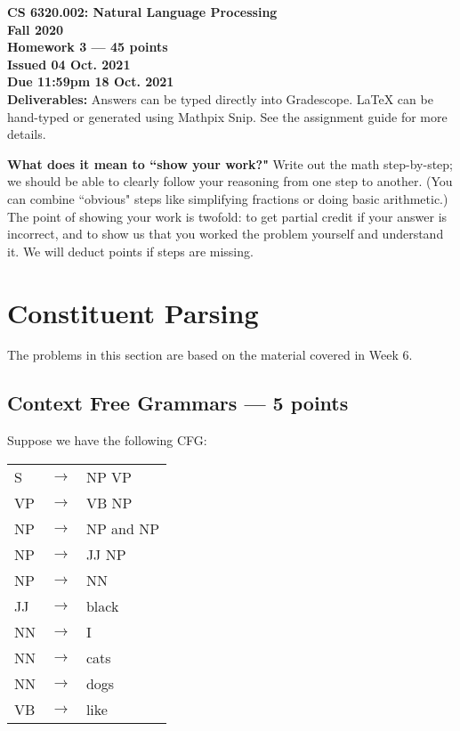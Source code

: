 \documentclass[12pt,a4paper]{article}
\begin{document}
\pagestyle{empty}

\textbf{CS 6320.002: Natural Language Processing} \\
\textbf{Fall 2020} \\

\textbf{Homework 3 --- 45 points} \\
\textbf{Issued 04 Oct. 2021} \\
\textbf{Due 11:59pm 18 Oct. 2021} \\

\textbf{Deliverables:} Answers can be typed directly into Gradescope. LaTeX can be hand-typed or generated using Mathpix Snip. See the assignment guide for more details.

\vspace{\baselineskip}

\textbf{What does it mean to ``show your work?"} Write out the math step-by-step; we should be able to clearly follow your reasoning from one step to another. (You can combine ``obvious" steps like simplifying fractions or doing basic arithmetic.) The point of showing your work is twofold: to get partial credit if your answer is incorrect, and to show us that you worked the problem yourself and understand it. We will deduct points if steps are missing.

\section{Constituent Parsing}

The problems in this section are based on the material covered in Week 6.

\subsection{Context Free Grammars --- 5 points}

 Suppose we have the following CFG:

\begin{center}
\begin{tabular}{l c l}
S & $\rightarrow$ & NP VP \\
VP & $\rightarrow$ & VB NP \\
NP & $\rightarrow$ & NP and NP \\
NP & $\rightarrow$ & JJ NP \\
NP & $\rightarrow$ & NN \\
JJ & $\rightarrow$ & black \\
NN & $\rightarrow$ & I \\
NN & $\rightarrow$ & cats \\
NN & $\rightarrow$ & dogs \\
VB & $\rightarrow$ & like \\
\end{tabular}
\end{center}
\end{document}
